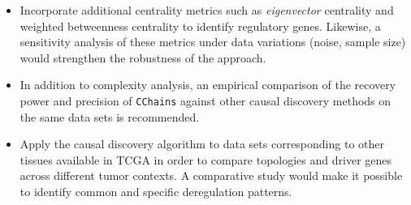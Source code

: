 \documentclass[12pt,a4paper]{report}
\begin{document}
\begin{itemize}
\item Incorporate additional centrality metrics such as \emph{eigenvector} centrality and weighted betweenness centrality to identify regulatory genes. Likewise, a sensitivity analysis of these metrics under data variations (noise, sample size) would strengthen the robustness of the approach.

\item In addition to complexity analysis, an empirical comparison of the recovery power and precision of \texttt{CChains} against other causal discovery methods on the same data sets is recommended.

\item Apply the causal discovery algorithm to data sets corresponding to other tissues available in TCGA in order to compare topologies and driver genes across different tumor contexts. A comparative study would make it possible to identify common and specific deregulation patterns.
      
\end{itemize}

\newpage
\end{document}
